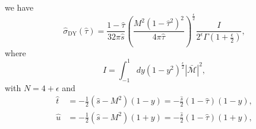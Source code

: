 we have
\begin{equation}
\hat{\sigma}_\text{DY}(\hat{\tau})=\frac{1-\hat{\tau}}{32\pi\hat{s}}\left( \frac{M^2(1-\hat{\tau}^2)^2}{4\pi\hat{\tau}} \right)^\frac{\epsilon}{2}\frac{I}{2^\epsilon\Gamma\left(1+\frac{\epsilon}{2}\right)},
\end{equation}
where
\begin{equation}
I=\int_{-1}^{1}dy(1-y^2)^\frac{\epsilon}{2}\left|\bar{\mathcal{M}}\right|^2,
\end{equation}
with $N=4+\epsilon$ and
\begin{align}
\hat{t}&=-\frac{1}{2}(\hat{s}-M^2)(1-y)=-\frac{\hat{s}}{2}(1-\hat{\tau})(1-y),\\
\hat{u}&=-\frac{1}{2}(\hat{s}-M^2)(1+y)=-\frac{\hat{s}}{2}(1-\hat{\tau})(1+y),
\end{align}

